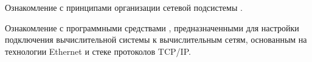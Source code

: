 
Ознакомление с принципами организации сетевой подсистемы \linux.

Ознакомление с программными средствами \linux, предназначенными для настройки подключения вычислительной системы
к вычислительным сетям, основанным на технологии Ethernet и стеке протоколов TCP/IP.

